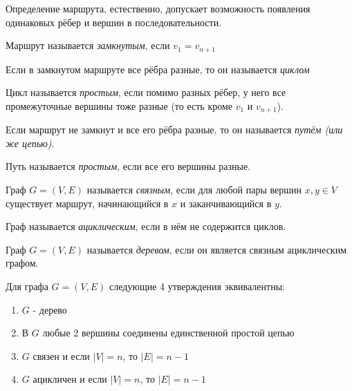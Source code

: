 \begin{note}
	Определение маршрута, естественно, допускает возможность появления одинаковых рёбер и вершин в последовательности.
\end{note}

\begin{definition}
	Маршрут называется \textit{замкнутым}, если $v_1 = v_{n + 1}$
\end{definition}

\begin{definition}
	Если в замкнутом маршруте все рёбра разные, то он называется \textit{циклом}
\end{definition}

\begin{definition}
	Цикл называется \textit{простым}, если помимо разных рёбер, у него все промежуточные вершины тоже разные (то есть кроме $v_1$ и $v_{n + 1}$).
\end{definition}

\begin{definition}
	Если маршрут не замкнут и все его рёбра разные, то он называется \textit{путём (или же цепью)}.
\end{definition}

\begin{definition}
	Путь называется \textit{простым}, если все его вершины разные.
\end{definition}

\begin{definition}
	Граф $G = (V, E)$ называется \textit{связным}, если для любой пары вершин $x, y \in V$ существует маршрут, начинающийся в $x$ и заканчивающийся в $y$.
\end{definition}

\begin{definition}
	Граф называется \textit{ациклическим}, если в нём не содержится циклов.
\end{definition}

\begin{definition}
	Граф $G = (V, E)$ называется \textit{деревом}, если он является связным ациклическим графом.
\end{definition}

\begin{theorem}
	Для графа $G = (V, E)$ следующие 4 утверждения эквивалентны:
	\begin{enumerate}
		\item $G$ - дерево
		
		\item В $G$ любые 2 вершины соединены единственной простой цепью
		
		\item $G$ связен и если $|V| = n$, то $|E| = n - 1$
		
		\item $G$ ацикличен и если $|V| = n$, то $|E| = n - 1$
	\end{enumerate}
\end{theorem}

